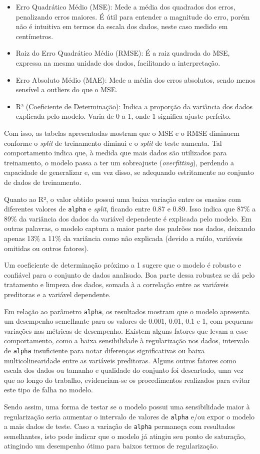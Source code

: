 \begin{itemize}
	\item Erro Quadrático Médio (MSE): Mede a média dos quadrados dos erros, penalizando erros maiores. É útil para entender a magnitude do erro, porém não é intuitiva em termos da escala dos dados, neste caso medido em centímetros.
	\item Raiz do Erro Quadrático Médio (RMSE): É a raiz quadrada do MSE, expressa na mesma unidade dos dados, facilitando a interpretação.
	\item Erro Absoluto Médio (MAE): Mede a média dos erros absolutos, sendo menos sensível a outliers do que o MSE.
	\item R² (Coeficiente de Determinação): Indica a proporção da variância dos dados explicada pelo modelo. Varia de 0 a 1, onde 1 significa ajuste perfeito.
\end{itemize}

Com isso, as tabelas apresentadas mostram que o MSE e o RMSE diminuem conforme o \textit{split} de treinamento diminui e o \textit{split} de teste aumenta. Tal comportamento indica que, à medida que mais dados são utilizados para treinamento, o modelo passa a ter um sobreajuste (\textit{overfitting}), perdendo a capacidade de generalizar e, em vez disso, se adequando estritamente ao conjunto de dados de treinamento.

Quanto ao R², o valor obtido possui uma baixa variação entre os ensaios com diferentes valores de \texttt{alpha} e \textit{split}, ficando entre 0.87 e 0.89. Isso indica que 87\% a 89\% da variância dos dados da variável dependente é explicada pelo modelo. Em outras palavras, o modelo captura a maior parte dos padrões nos dados, deixando apenas 13\% a 11\% da variância como não explicada (devido a ruído, variáveis omitidas ou outros fatores).

Um coeficiente de determinação próximo a 1 sugere que o modelo é robusto e confiável para o conjunto de dados analisado. Boa parte dessa robustez se dá pelo tratamento e limpeza dos dados, somada à a correlação entre as variáveis preditoras e a variável dependente.

Em relação ao parâmetro \texttt{alpha}, os resultados mostram que o modelo apresenta um desempenho semelhante para os valores de 0.001, 0.01, 0.1 e 1, com pequenas variações nas métricas de desempenho. Existem alguns fatores que levam a esse comportamento, como a baixa sensibilidade à regularização nos dados, intervalo de \texttt{alpha} insuficiente para notar diferenças significativas ou baixa multicolinearidade entre as variáveis preditoras. Alguns outros fatores como escala dos dados ou tamanho e qualidade do conjunto foi descartado, uma vez que ao longo do trabalho, evidenciam-se os procedimentos realizados para evitar este tipo de falha no modelo.

Sendo assim, uma forma de testar se o modelo possui uma sensibilidade maior à regularização seria aumentar o intervalo de valores de \texttt{alpha} e/ou expor o modelo a mais dados de teste. Caso a variação de \texttt{alpha} permaneça com resultados semelhantes, isto pode indicar que o modelo já atingiu seu ponto de saturação, atingindo um desempenho ótimo para baixos termos de regularização.
